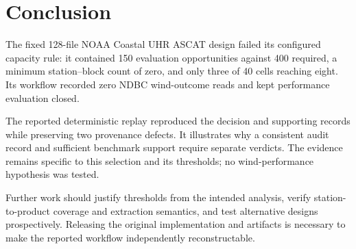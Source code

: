 \section{Conclusion}
\label{sec:conclusion}

The fixed 128-file NOAA Coastal UHR ASCAT design failed its configured capacity rule: it contained 150 evaluation opportunities against 400 required, a minimum station--block count of zero, and only three of 40 cells reaching eight. Its workflow recorded zero NDBC wind-outcome reads and kept performance evaluation closed.

The reported deterministic replay reproduced the decision and supporting records while preserving two provenance defects. It illustrates why a consistent audit record and sufficient benchmark support require separate verdicts. The evidence remains specific to this selection and its thresholds; no wind-performance hypothesis was tested.

Further work should justify thresholds from the intended analysis, verify station-to-product coverage and extraction semantics, and test alternative designs prospectively. Releasing the original implementation and artifacts is necessary to make the reported workflow independently reconstructable.
